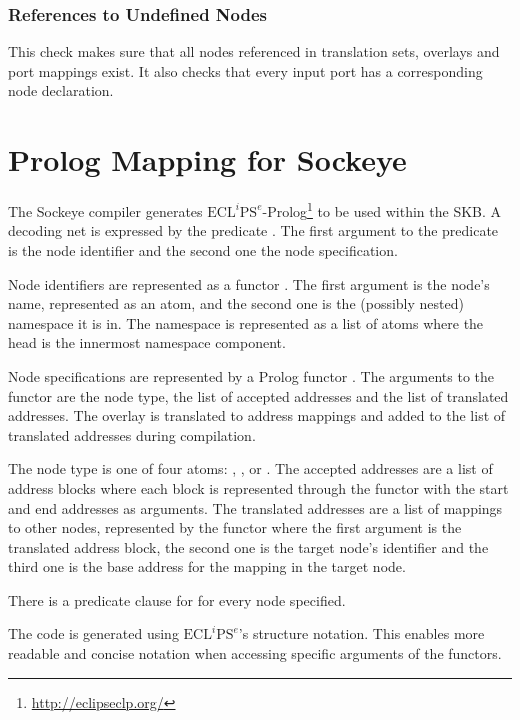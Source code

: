 \documentclass[a4paper,11pt,twoside]{report}
\begin{document}
{{{\subsection{References to Undefined Nodes}
This check makes sure that all nodes referenced in translation sets, overlays and port mappings exist.
It also checks that every input port has a corresponding node declaration.


\chapter{Prolog Mapping for Sockeye}
\label{chap:prolog}
The Sockeye compiler generates \(\text{ECL}^i\text{PS}^e\)-Prolog\footnote{\href{http://eclipseclp.org/}{http://eclipseclp.org/}} to be used within the SKB.
A decoding net is expressed by the predicate .
The first argument to the predicate is the node identifier and the second one the node specification.

Node identifiers are represented as a functor .
The first argument is the node's name, represented as an atom, and the second one is the (possibly nested) namespace it is in.
The namespace is represented as a list of atoms where the head is the innermost namespace component.

Node specifications are represented by a Prolog functor .
The arguments to the functor are the node type, the list of accepted addresses and the list of translated addresses.
The overlay is translated to address mappings and added to the list of translated addresses during compilation.

The node type is one of four atoms: , ,  or .
The accepted addresses are a list of address blocks where each block is represented through the functor  with the start and end addresses as arguments.
The translated addresses are a list of mappings to other nodes, represented by the functor  where the first argument is the translated address block, the second one is the target node's identifier and the third one is the base address for the mapping in the target node.

There is a predicate clause for  for every node specified.

The code is generated using \(\text{ECL}^i\text{PS}^e\)'s structure notation.
This enables more readable and concise notation when accessing specific arguments of the functors.

}}}
\end{document}
